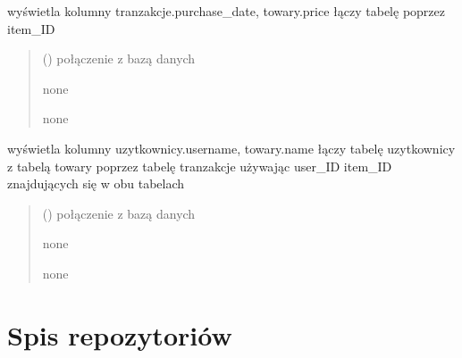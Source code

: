 \documentclass[letterpaper,10pt,polish]{sphinxmanual}
\begin{document}
\begin{fulllineitems}

\pysigstartsignatures
{}
\pysigstopsignatures
\sphinxAtStartPar
wyświetla kolumny tranzakcje.purchase\_date, towary.price łączy tabelę poprzez item\_ID
\begin{quote}\begin{description}
\sphinxAtStartPar
{} () \textendash{} połączenie z bazą danych

\sphinxAtStartPar
none

\sphinxAtStartPar
none

\end{description}\end{quote}

\end{fulllineitems}



\begin{fulllineitems}

\pysigstartsignatures
{}
\pysigstopsignatures
\sphinxAtStartPar
wyświetla kolumny uzytkownicy.username, towary.name łączy tabelę uzytkownicy z tabelą towary poprzez tabelę tranzakcje używając user\_ID item\_ID znajdujących się w obu tabelach
\begin{quote}\begin{description}
\sphinxAtStartPar
{} () \textendash{} połączenie z bazą danych

\sphinxAtStartPar
none

\sphinxAtStartPar
none

\end{description}\end{quote}

\end{fulllineitems}


\sphinxstepscope


\chapter{Spis repozytoriów}
\label{\detokenize{rozdzial5/index:spis-repozytoriow}}\label{\detokenize{rozdzial5/index::doc}}
\end{document}
